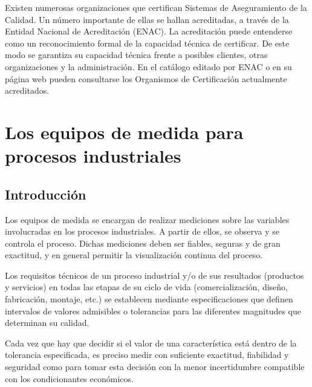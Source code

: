 Existen numerosas organizaciones que certifican Sistemas de Aseguramiento de la Calidad. Un número importante de ellas se hallan acreditadas, a través de la Entidad Nacional de Acreditación (ENAC). La acreditación puede entenderse como un reconocimiento formal de la capacidad técnica de certificar. De este modo se garantiza su capacidad técnica frente a posibles clientes, otras organizaciones y la administración. En el catálogo editado por ENAC o en su página web pueden consultarse los Organismos de Certificación actualmente acreditados.


\section{Los equipos de medida para procesos industriales}
\label{sec:equipos_de_medida}


\subsection{Introducción}

Los equipos de medida se encargan de realizar mediciones sobre las variables involucradas en los procesos industriales. A partir de ellos, se observa y se controla el proceso. Dichas mediciones deben ser fiables, seguras y de gran exactitud, y en general permitir la visualización continua del proceso.

\begin{parrafoDestacado}
Los requisitos técnicos de un proceso industrial y/o de sus resultados (productos y servicios) en todas las etapas de su ciclo de vida (comercialización, diseño, fabricación, montaje, etc.) se establecen mediante especificaciones que definen intervalos de valores admisibles o tolerancias para las diferentes magnitudes que determinan su calidad.
\end{parrafoDestacado}

Cada vez que hay que decidir si el valor de una característica está dentro de la tolerancia especificada, es preciso medir con suficiente exactitud, fiabilidad y seguridad como para tomar esta decisión con la menor incertidumbre compatible con los condicionantes económicos.



